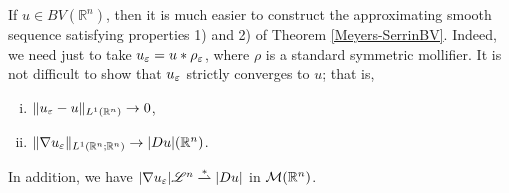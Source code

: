 \begin{remark} \label{BVR^N} If $u \in BV(\mathbb{R}^{n})$, then it is much easier to construct the approximating smooth sequence satisfying properties 1) and 2) of Theorem \ref{Meyers-SerrinBV}. Indeed, we need just to take $u_{\varepsilon} = u \ast \rho_{\varepsilon}$, where $\rho$ is a standard symmetric mollifier. It is not difficult to show that $u_{\varepsilon}$ strictly converges to $u$; that is,
\begin{enumerate}[i)]
\item $\| u_{\varepsilon} - u\|_{L^{1}(\mathbb{R}^{n})} \to 0$,
\item $\|\nabla u_{\varepsilon}\|_{L^{1}(\mathbb{R}^{n}; \mathbb{R}^{n})} \to |Du|(\mathbb{R}^{n})$. 
\end{enumerate}
In addition, we have $|\nabla u_{\varepsilon}| \mathscr{L}^{n} \overset{*}{\rightharpoonup} |Du|$ in $\mathcal{M}(\mathbb{R}^{n})$.



\end{remark}
